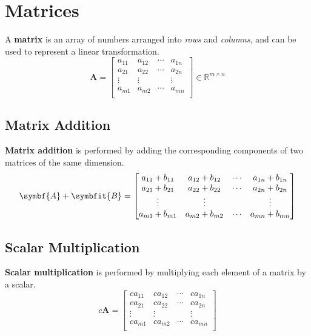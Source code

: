 \documentclass{article}
\begin{document}
\section{Matrices}
\begin{definition}
    A \textbf{matrix} is an array of numbers arranged into \textit{rows}
    and \textit{columns}, and can be used to represent a linear
    transformation.
    \begin{equation*}
        \symbf{A} =
        \begin{bmatrix}
            a_{11} & a_{12} & \cdots & a_{1n} \\
            a_{21} & a_{22} & \cdots & a_{2n} \\
            \vdots & \vdots &        & \vdots \\
            a_{m1} & a_{m2} & \cdots & a_{mn} \\
        \end{bmatrix}
        \in \mathbb{R}^{m \times n}
    \end{equation*}
\end{definition}
\subsection{Matrix Addition}
\begin{definition}
    \textbf{Matrix addition} is performed by adding the corresponding
    components of two matrices of the same dimension.
    \begin{equation*}
        \symbf{A} + \symbfit{B} =
        \begin{bmatrix}
            a_{11} + b_{11} & a_{12} + b_{12} & \cdots & a_{1n} + b_{1n} \\
            a_{21} + b_{21} & a_{22} + b_{22} & \cdots & a_{2n} + b_{2n} \\
            \vdots          & \vdots          &        & \vdots          \\
            a_{m1} + b_{m1} & a_{m2} + b_{m2} & \cdots & a_{mn} + b_{mn} \\
        \end{bmatrix}
    \end{equation*}
\end{definition}
\subsection{Scalar Multiplication}
\begin{definition}
    \textbf{Scalar multiplication} is performed by multiplying each
    element of a matrix by a scalar.
    \begin{equation*}
        c\symbf{A} =
        \begin{bmatrix}
            ca_{11} & ca_{12} & \cdots & ca_{1n} \\
            ca_{21} & ca_{22} & \cdots & ca_{2n} \\
            \vdots  & \vdots  &        & \vdots  \\
            ca_{m1} & ca_{m2} & \cdots & ca_{mn} \\
        \end{bmatrix}
    \end{equation*}
\end{definition}
\end{document}
